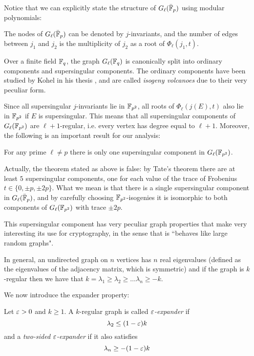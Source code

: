 Notice that we can explicitly state the structure of $G_\ell(\bar{\mathbb{F}}_p)$ using modular polynomials:
\begin{proposition}
    The nodes of $G_\ell(\bar {\mathbb{F}}_p)$ can be denoted by $j$-invariants, and the number of edges between $j_1$ and $j_2$ is the multiplicity of $j_2$ as a root of $\Phi_\ell(j_1,t)$.
\end{proposition}

Over a finite field $\mathbb{F}_q$, the graph $G_\ell(\mathbb{F}_q)$ is canonically split into ordinary components and supersingular components. The ordinary components have been studied by Kohel in his thesis \cite{Kohel_thesis}, and are called \emph{isogeny volcanoes} due to their very peculiar form.

Since all supersingular $j$-invariants lie in $\mathbb{F}_{p^2}$, all roots of $\Phi_\ell(j(E),t)$ also lie in $\mathbb{F}_{p^2}$ if $E$ is supersingular. This means that all supersingular components of $G_\ell(\mathbb{F}_{p^2})$ are $\ell+1$-regular, i.e. every vertex has degree equal to $\ell+1$. Moreover, the following is an important result for our analysis:
\begin{theorem}
    For any prime $\ell\neq p$ there is only one supersingular component in $G_\ell(\mathbb{F}_{p^2})$.
\end{theorem}
Actually, the theorem stated as above is false: by Tate's theorem there are at least $5$ supersingular components, one for each value of the trace of Frobenius $t\in\{0,\pm p,\pm 2p\}$. What we mean is that there is a single supersingular component in $G_\ell(\bar{\mathbb{F}}_p)$, and by carefully choosing $\mathbb{F}_{p^2}$-isogenies it is isomorphic to both components of $G_\ell(\mathbb{F}_{p^2})$ with trace $\pm 2p$.

This supersingular component has very peculiar graph properties that make very interesting its use for cryptography, in the sense that is ``behaves like large random graphs".

In general, an undirected graph on $n$ vertices has $n$ real eigenvalues (defined as the eigenvalues of the adjacency matrix, which is symmetric) and if the graph is $k$-regular then we have that $k=\lambda_1\ge\lambda_2\ge\dots \lambda_n\ge -k$.

We now introduce the expander property:
\begin{definition}
    Let $\varepsilon>0$ and $k\ge1$. A $k$-regular graph is called \emph{$\varepsilon$-expander} if
    $$\lambda_2\le(1-\varepsilon)k$$
    and a \emph{two-sided $\varepsilon$-expander} if it also satisfies 
    $$\lambda_n\ge-(1-\varepsilon)k$$
\end{definition}

